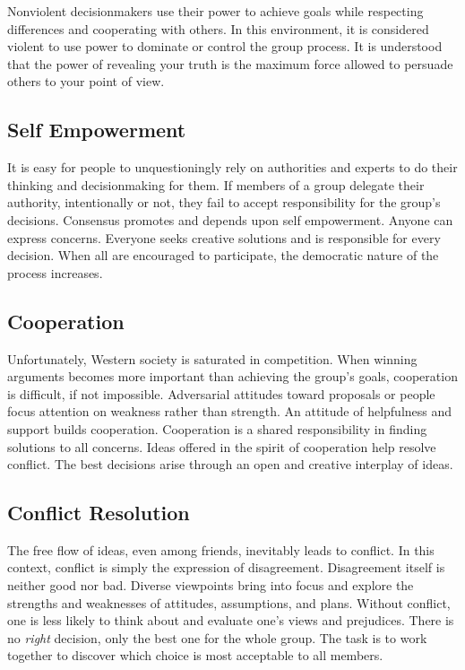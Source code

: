 Nonviolent decisionmakers use their power to achieve goals while respecting differences and cooperating with others. In this environment, it is considered violent to use power to dominate or control the group process. It is understood that the power of revealing your truth is the maximum force allowed to persuade others to your point of view.

\subsection*{Self Empowerment}

It is easy for people to unquestioningly rely on authorities and experts to do their thinking and decisionmaking for them. If members of a group delegate their authority, intentionally or not, they fail to accept responsibility for the group's decisions. Consensus promotes and depends upon self empowerment. Anyone can express concerns. Everyone seeks creative solutions and is responsible for every decision. When all are encouraged to participate, the democratic nature of the process increases.

\subsection*{Cooperation}

Unfortunately, Western society is saturated in competition. When winning arguments becomes more important than achieving the group's goals, cooperation is difficult, if not impossible. Adversarial attitudes toward proposals or people focus attention on weakness rather than strength. An attitude of helpfulness and support builds cooperation. Cooperation is a shared responsibility in finding solutions to all concerns. Ideas offered in the spirit of cooperation help resolve conflict. The best decisions arise through an open and creative interplay of ideas.

\subsection*{Conflict Resolution}

The free flow of ideas, even among friends, inevitably leads to conflict. In this context, conflict is simply the expression of disagreement. Disagreement itself is neither good nor bad. Diverse viewpoints bring into focus and explore the strengths and weaknesses of attitudes, assumptions, and plans. Without conflict, one is less likely to think about and evaluate one's views and prejudices. There is no \emph{right} decision, only the best one for the whole group. The task is to work together to discover which choice is most acceptable to all members.

